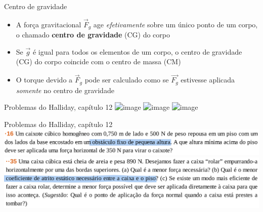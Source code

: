 \documentclass[t,%
brazilian,%
11pt,%
aspectratio=169,%
table%
]{beamer}
\begin{document}
\begin{frame}[c]{Centro de gravidade}
    \begin{itemize}
        \item A força gravitacional \( \vec{F}_g\) age \textit{efetivamente}
            sobre um único ponto de um corpo, o chamado \textbf{centro de
            gravidade} (CG) do corpo
    \item Se \( \vec{g}\) é igual para todos os elementos de um corpo, o centro
        de gravidade (CG) do corpo coincide com o centro de massa (CM)

    \item O torque devido a \(\vec{F}_g\) pode ser calculado como se
        \(\vec{F_g}\) estivesse aplicada \textit{somente} no centro de
            gravidade
    \end{itemize}
\end{frame}

\begin{frame}{Problemas do Halliday, capítulo 12}
    \includegraphics<1>[width=\textwidth]{images/Captura de tela de 2023-12-07 13-20-01.png}
    \includegraphics<1>[width=\textwidth-10pt*\real{3.72}]{images/Captura de tela de 2023-12-07 13-20-13.png}
    \includegraphics<1>[width=\textwidth]{images/Captura de tela de 2023-12-07 13-29-07.png}
\end{frame}


\begin{frame}{Problemas do Halliday, capítulo 12}
    \centering
    \includegraphics[width=\textwidth-4pt*\real{9.93}]{images/Captura de tela de 2023-12-07 12-56-58.png}
    \includegraphics[width=\textwidth-4pt*\real{9.93}]{images/Captura de tela de 2023-12-07 13-38-29.png}
\end{frame}
\end{document}
